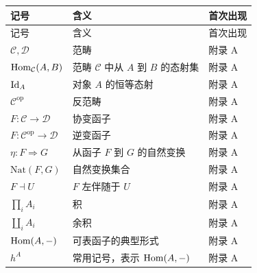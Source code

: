 \begin{longtable}{p{}p{}p{}}
\toprule
记号 & 含义 & 首次出现 \\
\midrule
\endfirsthead
\toprule
记号 & 含义 & 首次出现 \\
\midrule
\endhead
$\mathcal{C},\mathcal{D}$ & 范畴 & 附录 A \\
$\mathrm{Hom}_{\mathcal{C}}(A,B)$ & 范畴 $\mathcal{C}$ 中从 $A$ 到 $B$ 的态射集 & 附录 A \\
$\mathrm{Id}_A$ & 对象 $A$ 的恒等态射 & 附录 A \\
$\mathcal{C}^{\mathrm{op}}$ & 反范畴 & 附录 A \\
$F:\mathcal{C}\to\mathcal{D}$ & 协变函子 & 附录 A \\
$F:\mathcal{C}^{\mathrm{op}}\to\mathcal{D}$ & 逆变函子 & 附录 A \\
$\eta:F\Rightarrow G$ & 从函子 $F$ 到 $G$ 的自然变换 & 附录 A \\
$\mathrm{Nat}(F,G)$ & 自然变换集合 & 附录 A \\
$F\dashv U$ & $F$ 左伴随于 $U$ & 附录 A \\
$\prod_i A_i$ & 积 & 附录 A \\
$\coprod_i A_i$ & 余积 & 附录 A \\
$\mathrm{Hom}(A,-)$ & 可表函子的典型形式 & 附录 A \\
$h^A$ & 常用记号，表示 $\mathrm{Hom}(A,-)$ & 附录 A \\
\bottomrule
\end{longtable}
